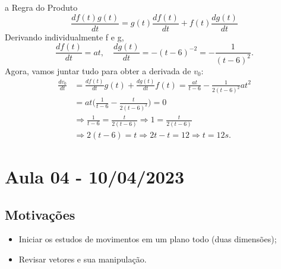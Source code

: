 \documentclass{article}
\begin{document}
  a Regra do Produto 
    $$
      \boxed{\frac{df(t)g(t)}{dt}= g(t)\frac{df(t)}{dt} + f(t)\frac{dg(t)}{dt}}
    $$
    Derivando individualmente f e g, 
      $$
        \frac{df(t)}{dt} = at, \quad \frac{dg(t)}{dt} = -(t-6)^{-2} = -\frac{1}{(t-6)^{2}}.
      $$
    Agora, vamos juntar tudo para obter a derivada de $v_{0}$: 
    \begin{align*}
      \frac{dv_{0}}{dt} &= \frac{df(t)}{dt}g(t) + \frac{dg(t)}{dt}f(t) = \frac{at}{t-6} - \frac{1}{2(t-6)^{2}}at^{2}\\
                        &= at\biggl(\frac{1}{t-6} - \frac{t}{2(t-6)^{2}}\biggr) = 0 \\
                        & \Rightarrow \frac{1}{t-6} = \frac{t}{2(t-6)} \Rightarrow 1 = \frac{t}{2(t-6)}\\
                        & \Rightarrow 2(t-6) = t \Rightarrow 2t - t = 12 \Rightarrow t = 12s.
    \end{align*}
\newpage

\section{Aula 04 - 10/04/2023}
\subsection{Motiva\c c\~oes}
 \begin{itemize}
   \item Iniciar os estudos de movimentos em um plano todo (duas dimens\~oes);
   \item Revisar vetores e sua manipula\c c\~ao.
 \end{itemize}
\end{document}
